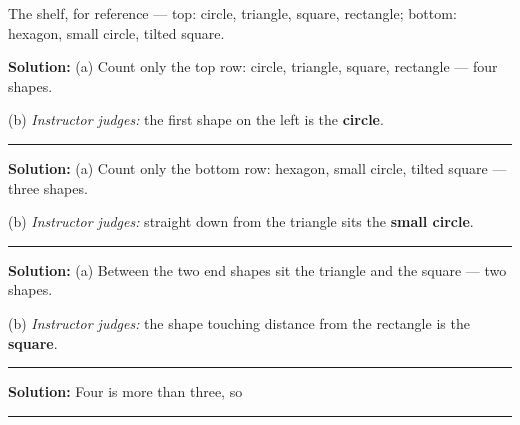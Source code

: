 \documentclass[12pt]{article}
\begin{document}


\noindent The shelf, for reference --- top: circle, triangle, square,
rectangle; bottom: hexagon, small circle, tilted square.

\vspace{0.2cm}


\textbf{Solution:} (a) Count only the top row: circle, triangle, square,
rectangle --- four shapes. 

(b) \emph{Instructor judges:} the first shape on the left is the
\textbf{circle}.

\vspace{0.2cm}\noindent\rule{\linewidth}{0.2pt}\vspace{0.1cm}


\textbf{Solution:} (a) Count only the bottom row: hexagon, small circle,
tilted square --- three shapes. 

(b) \emph{Instructor judges:} straight down from the triangle sits the
\textbf{small circle}.

\vspace{0.2cm}\noindent\rule{\linewidth}{0.2pt}\vspace{0.1cm}


\textbf{Solution:} (a) Between the two end shapes sit the triangle and the
square --- two shapes. 

(b) \emph{Instructor judges:} the shape touching distance from the rectangle
is the \textbf{square}.

\vspace{0.2cm}\noindent\rule{\linewidth}{0.2pt}\vspace{0.1cm}


\textbf{Solution:} Four is more than three, so 

\vspace{0.2cm}\noindent\rule{\linewidth}{0.2pt}\vspace{0.1cm}

\end{document}
